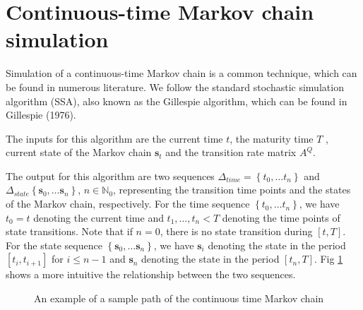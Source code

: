 \documentclass[11pt]{article}
\numberwithin{equation}{section}
\begin{document}
\section{Continuous-time Markov chain simulation}

Simulation of a continuous-time Markov chain is a common technique, which
can be found in numerous literature. We follow the standard stochastic
simulation algorithm (SSA), also known as the Gillespie algorithm, which can
be found in Gillespie (1976).

The inputs for this algorithm are the current time $t$, the maturity time $T$%
, current state of the Markov chain $\mathbf{s}_t$ and the transition rate
matrix $A^Q$.

The output for this algorithm are two sequences $\Delta_{time} =\left\lbrace
t_0,\ldots t_n \right\rbrace $ and $\Delta_{state}\left\lbrace \mathbf{s}%
_0,\ldots \mathbf{s}_n\right\rbrace $, $n\in \mathbb{N}_0$, representing the
transition time points and the states of the Markov chain, respectively. For
the time sequence $\left\lbrace t_0,\ldots t_n \right\rbrace $, we have $%
t_0=t$ denoting the current time and $t_1,\ldots, t_n<T$ denoting the time
points of state transitions. Note that if $n=0$, there is no state
transition during $\left[t,T \right]$. For the state sequence $\left\lbrace 
\mathbf{s}_0,\ldots \mathbf{s}_n\right\rbrace$, we have $\mathbf{s}_{i}$
denoting the state in the period $\left[ t_{i}, t_{i+1} \right] $ for $i\leq
n-1$ and $\mathbf{s}_n$ denoting the state in the period $\left[ t_{n}, T %
\right] $. Fig \ref{Fig:ctmc} shows a more intuitive the relationship
between the two sequences.

\begin{figure}[h]
\caption{An example of a sample path of the continuous time Markov chain}
\label{Fig:ctmc}
\end{figure}
\end{document}
